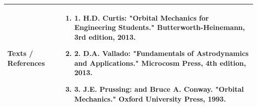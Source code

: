 \documentclass[11pt,a4paper]{article}
\begin{document}
\vspace{8pt}
\renewcommand{\arraystretch}{1.3}
\begin{tabularx}{\textwidth}{|p{3.2cm}|X|}
\hline
\textbf{Texts / References} & \begin{enumerate}[leftmargin=*,noitemsep,topsep=2pt]  \item 1. H.D. Curtis: "Orbital Mechanics for Engineering Students." Butterworth-Heinemann, 3rd  edition, 2013.  \item 2. D.A. Vallado: "Fundamentals of Astrodynamics and Applications." Microcosm Press, 4th  edition, 2013.  \item 3. J.E. Prussing: and Bruce A. Conway. "Orbital Mechanics." Oxford University Press, 1993.\end{enumerate} \\
\hline
\end{tabularx}
\clearpage
\end{document}
